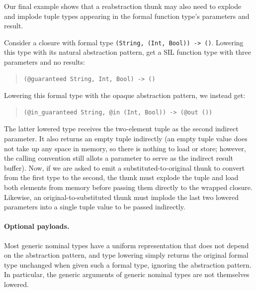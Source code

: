 \documentclass[../generics]{subfiles}
\begin{document}
Our final example shows that a reabstraction thunk may also need to explode and implode tuple types appearing in the formal function type's parameters and result.
\begin{example}
Consider a closure with formal type \texttt{(String, (Int, Bool)) -> ()}. Lowering this type with its natural abstraction pattern, get a SIL function type with three parameters and no results:
\begin{quote}
\begin{verbatim}
(@guaranteed String, Int, Bool) -> ()
\end{verbatim}
\end{quote}
Lowering this formal type with the opaque abstraction pattern, we instead get:
\begin{quote}
\begin{verbatim}
(@in_guaranteed String, @in (Int, Bool)) -> (@out ())
\end{verbatim}
\end{quote}
The latter lowered type receives the two-element tuple as the second indirect parameter. It also returns an empty tuple indirectly (an empty tuple value does not take up any space in memory, so there is nothing to load or store; however, the calling convention still allots a parameter to serve as the indirect result buffer). Now, if we are asked to emit a substituted-to-original thunk to convert from the first type to the second, the thunk must explode the tuple and load both elements from memory before passing them directly to the wrapped closure. Likewise, an original-to-substituted thunk must implode the last two lowered parameters into a single tuple value to be passed indirectly.
\end{example}

\paragraph{Optional payloads.}
Most generic nominal types have a uniform representation that does not depend on the abstraction pattern, and type lowering simply returns the original formal type unchanged when given such a formal type, ignoring the abstraction pattern. In particular, the generic arguments of generic nominal types are not themselves lowered.
\end{document}
